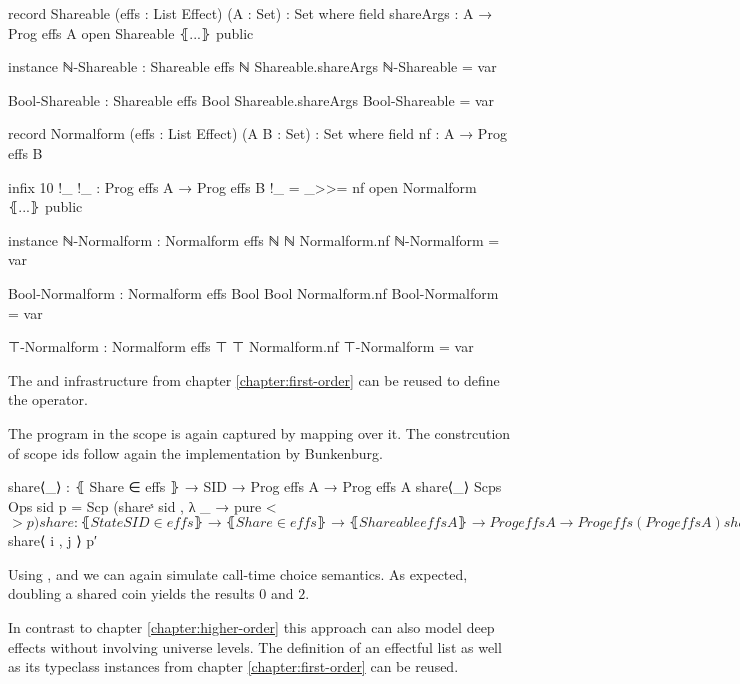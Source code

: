 \begin{code}[hide]
record Shareable (effs : List Effect) (A : Set) : Set where
  field
    shareArgs : A → Prog effs A
open Shareable ⦃...⦄ public

instance
  ℕ-Shareable : Shareable effs ℕ
  Shareable.shareArgs ℕ-Shareable = var

  Bool-Shareable : Shareable effs Bool
  Shareable.shareArgs Bool-Shareable = var

record Normalform (effs : List Effect) (A B : Set) : Set where
  field
    nf : A → Prog effs B

  infix 10 !_
  !_ : Prog effs A → Prog effs B
  !_ = _>>= nf
open Normalform ⦃...⦄ public

instance
  ℕ-Normalform : Normalform effs ℕ ℕ
  Normalform.nf ℕ-Normalform = var

  Bool-Normalform : Normalform effs Bool Bool
  Normalform.nf Bool-Normalform = var

  ⊤-Normalform : Normalform effs ⊤ ⊤
  Normalform.nf ⊤-Normalform = var
\end{code}
The  and  infrastructure from
chapter \ref{chapter:first-order} can be reused to define the
 operator.

The program in the scope is again captured by mapping  over it.
The constrcution of scope ids follow again the implementation by Bunkenburg.

\begin{code}
share⟨_⟩ : ⦃ Share ∈ effs ⦄ → SID → Prog effs A → Prog effs A
share⟨_⟩ {Scps} {Ops} sid p = Scp (shareˢ sid , λ _ → pure <$> p)

share : ⦃ State SID ∈ effs ⦄ → ⦃ Share ∈ effs ⦄ → ⦃ Shareable effs A ⦄ →
  Prog effs A → Prog effs (Prog effs A)
share {Ops} {Scps} p = do
    (i , j) ← get
    put (i + 1 , j)
    let p′ = do
          put (i , j + 1)
          x  ← p
          x′ ← shareArgs x
          put (i + 1 , j)
          pure x′
    pure $ share⟨ i , j ⟩ p′
\end{code}
Using ,  and  we
can again simulate call-time choice semantics.
As expected, doubling a shared coin yields the results $0$ and $2$.

In contrast to chapter \ref{chapter:higher-order} this approach can also model
deep effects without involving universe levels.
The definition of an effectful list as well as its typeclass instances from
chapter \ref{chapter:first-order} can be reused.

